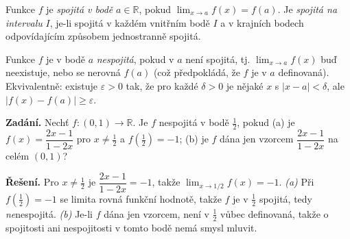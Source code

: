 \documentclass[11pt,a4paper]{article}
\begin{document}
\begin{definice}[Spojitost]
Funkce $f$ je \emph{spojitá v bodě} $a\in\mathbb{R}$, pokud $\lim_{x\to a}f(x)=f(a)$. Je \emph{spojitá na intervalu} $I$, je-li spojitá v každém vnitřním bodě $I$ a v krajních bodech odpovídajícím způsobem jednostranně spojitá.
\end{definice}

\begin{definice}
Funkce $f$ je v bodě $a$ \emph{nespojitá}, pokud v $a$ není spojitá, tj. $\lim_{x\to a}f(x)$ buď neexistuje, nebo se nerovná $f(a)$ (což předpokládá, že $f$ je v $a$ definovaná). Ekvivalentně: existuje $\varepsilon>0$ tak, že pro každé $\delta>0$ je nějaké $x$ s $|x-a|<\delta$, ale $|f(x)-f(a)|\ge\varepsilon$.
\end{definice}

\begin{priklad} \par
\textbf{Zadání.} Nechť $f\colon(0,1)\to\mathbb R$. Je $f$ nespojitá v bodě $\tfrac12$, pokud (a) je $f(x)=\dfrac{2x-1}{1-2x}$ pro $x\neq\tfrac12$ a $f(\tfrac12)=-1$; (b) je $f$ dána jen vzorcem $\dfrac{2x-1}{1-2x}$ na celém $(0,1)$?\par
\textbf{Řešení.} Pro $x\neq\tfrac12$ je $\dfrac{2x-1}{1-2x}=-1$, takže $\lim_{x\to1/2}f(x)=-1$. \emph{(a)} Při $f(\tfrac12)=-1$ se limita rovná funkční hodnotě, takže $f$ je v $\tfrac12$ spojitá, tedy \emph{ne}nespojitá. \emph{(b)} Je-li $f$ dána jen vzorcem, není v $\tfrac12$ vůbec definovaná, takže o spojitosti ani nespojitosti v tomto bodě nemá smysl mluvit.

\begin{center}
\end{center}
\end{priklad}
\end{document}
